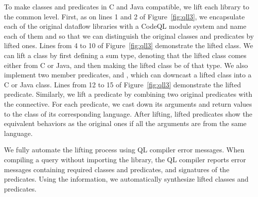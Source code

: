 To make classes and predicates in C and Java compatible,
we lift each library to the common level.
First, as on lines 1 and 2 of Figure~\ref{fig:qll3}, we encapsulate each of the original dataflow libraries with a CodeQL
module system and name each of them  and  so that we can distinguish the original
classes and predicates by lifted ones.
Lines from 4 to 10 of Figure~\ref{fig:qll3} demonstrate the lifted class.
We can lift a class by first defining a sum type, denoting that
the lifted class comes either from C or Java, and then making the
lifted class be of that type.  We also implement two member predicates,
 and ,
which can downcast a lifted class into a C or Java class.
Lines from 12 to 15 of Figure~\ref{fig:qll3} demonstrate the lifted predicate.
Similarly, we lift a predicate by combining two original predicates with
the  connective. For each predicate, we cast down
its arguments and return values to the class of its corresponding language.
After lifting, lifted predicates show the equivalent behaviors as the
original ones if all the arguments are from the same language.

We fully automate the lifting process using QL compiler error
messages. When compiling a query without importing the library, the QL compiler
reports error messages containing required classes and predicates, and
signatures of the predicates. Using the information, we
automatically synthesize lifted classes and predicates.



